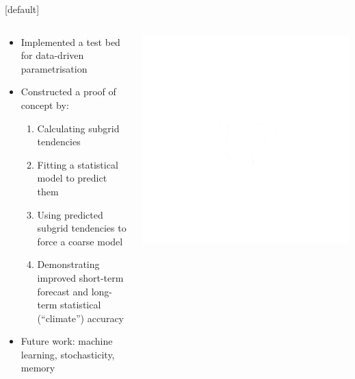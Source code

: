 \documentclass[12pt, aspectratio=169]{beamer}
\begin{document}
\begin{frame}
    [default]
    \begin{columns}
        \begin{column}{0.75\linewidth}
            \begin{itemize}
                \setlength{\itemsep}{6pt}
                \item Implemented a test bed for data-driven parametrisation
                \item Constructed a proof of concept by:
                \vspace{6pt}
                \begin{enumerate}
                    \setlength{\itemsep}{6pt}
                    \item Calculating subgrid tendencies
                    \item Fitting a statistical model to predict them
                    \item Using predicted subgrid tendencies to force
                        a coarse model
                    \item Demonstrating improved short-term forecast and
                        long-term statistical (``climate'') accuracy
                \end{enumerate}
                \item Future work: machine learning, stochasticity, memory
            \end{itemize}
        \end{column}
        \begin{column}{0.25\linewidth}
            \centering
            \includegraphics[width=\linewidth]{figures/qr_code.pdf}
        \end{column}
    \end{columns}
\end{frame}
\end{document}
